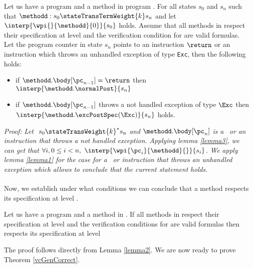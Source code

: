 \begin{lemma}\label{lemma2}
Let us have a program \Program{} and a method \methodd{} in program \Program.
For all states $s_0$ and $s_n$ such that   $\methodd : s_0  \stateTransTermWeight{k} s_n $
and let $\interp{ \wpi{} {\methodd}{0}}{ s_{0}}$ holds. Assume that
  all methods in \Program{} respect their specification at level  and 
the verification condition for \Program{} are valid formulas.
Let the program counter in state $s_n$ points to an instruction $\return $ or
 an instruction which throws an unhandled exception of type \mbox{\rm\texttt{Exc}}, then  the following holds:
\begin{itemize}
    \item if $\methodd.\body[\pc_{n-1}] = \return $     then $\interp{ \methodd.\normalPost}{s_{n}}$

    	\item if $\methodd.\body[\pc_{n-1}]$ throws a not handled exception of type $\Exc$  then  $\interp{\methodd.\excPostSpec( \Exc)}{ s_{n} } $ holds.
	

\end{itemize}
\end{lemma}
\textit{Proof:} 
\textit{Let $ \ s_{0} \stateTransWeight{k}^{*} s_n $ and $\methodd.\body[\pc_n]$ is a \return \ or an instruction that throws a  not handled exception.
 Applying lemma \ref{lemma3}, we can get that $\forall i, 0 \le i < n , \ \interp{ \wpi{\pc_i } {\methodd}{ } }{ s_{i}}$. 
We apply lemma \ref{lemma1} for the case for a \return \ or instruction that throws an unhandled exception which allows to conclude that the current statement holds.
}\\
\Qed\\

Now, we establish under what conditions we can conclude that a method respects its specification at level .
\begin{lemma}\label{lemmaMethRespSpec}
Let us have a program \Program{} and a method \methodd{} in \Program.
If  all methods in \Program{} respect their specification at level   and 
 the verification conditions for \Program{} are valid formulas
then \methodd{}  respects its specification at level  
\end{lemma}
 The proof  follows directly from Lemma \ref{lemma2}. We are now ready to prove Theorem \ref{vcGenCorrect}.


